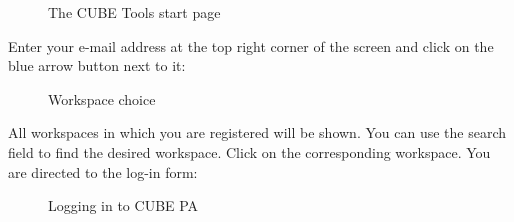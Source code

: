 \begin{figure}[H]
\caption{The CUBE Tools start page}
\end{figure}

Enter your e-mail address at the top right corner of the screen and click on the blue arrow button next to it:

\begin{figure}[H]
\caption{Workspace choice}
\end{figure}

All workspaces in which you are registered will be shown. You can use the search field to find the desired workspace. Click on the corresponding workspace. You are directed to the log-in form:

\begin{figure}[H]
\caption{Logging in to CUBE PA}
\end{figure}

